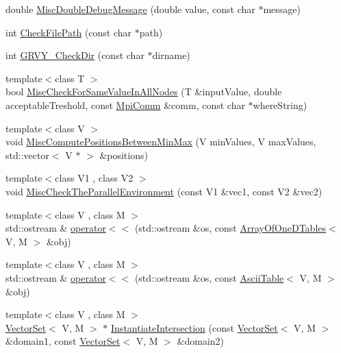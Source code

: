 \begin{DoxyCompactItemize}
\item 
double \hyperlink{namespace_q_u_e_s_o_a976de592e2133af50b80f6aad1352165}{Misc\-Double\-Debug\-Message} (double value, const char $\ast$message)
\item 
int \hyperlink{namespace_q_u_e_s_o_abc55c11f68bb99c4eba88030f1164764}{Check\-File\-Path} (const char $\ast$path)
\item 
int \hyperlink{namespace_q_u_e_s_o_a56d7533d2177cf02d3fd761f7a22a873}{G\-R\-V\-Y\-\_\-\-Check\-Dir} (const char $\ast$dirname)
\item 
{\footnotesize template$<$class T $>$ }\\bool \hyperlink{namespace_q_u_e_s_o_a4166a375c5adbea35afaaf20775bc519}{Misc\-Check\-For\-Same\-Value\-In\-All\-Nodes} (T \&input\-Value, double acceptable\-Treshold, const \hyperlink{class_q_u_e_s_o_1_1_mpi_comm}{Mpi\-Comm} \&comm, const char $\ast$where\-String)
\item 
{\footnotesize template$<$class V $>$ }\\void \hyperlink{namespace_q_u_e_s_o_a3a6b46538ead03c47f13e60542608e34}{Misc\-Compute\-Positions\-Between\-Min\-Max} (V min\-Values, V max\-Values, std\-::vector$<$ V $\ast$ $>$ \&positions)
\item 
{\footnotesize template$<$class V1 , class V2 $>$ }\\void \hyperlink{namespace_q_u_e_s_o_a57ad15be98b39ff64e0719305c639c75}{Misc\-Check\-The\-Parallel\-Environment} (const V1 \&vec1, const V2 \&vec2)
\item 
{\footnotesize template$<$class V , class M $>$ }\\std\-::ostream \& \hyperlink{namespace_q_u_e_s_o_a741c4181f77af64b1e82cdce4d203cfa}{operator$<$$<$} (std\-::ostream \&os, const \hyperlink{class_q_u_e_s_o_1_1_array_of_one_d_tables}{Array\-Of\-One\-D\-Tables}$<$ V, M $>$ \&obj)
\item 
{\footnotesize template$<$class V , class M $>$ }\\std\-::ostream \& \hyperlink{namespace_q_u_e_s_o_abd30e6a15a8d9117611fddd7d06c3eed}{operator$<$$<$} (std\-::ostream \&os, const \hyperlink{class_q_u_e_s_o_1_1_ascii_table}{Ascii\-Table}$<$ V, M $>$ \&obj)
\item 
{\footnotesize template$<$class V , class M $>$ }\\\hyperlink{class_q_u_e_s_o_1_1_vector_set}{Vector\-Set}$<$ V, M $>$ $\ast$ \hyperlink{namespace_q_u_e_s_o_aa79046437ab085c5487ae16e9a0baeec}{Instantiate\-Intersection} (const \hyperlink{class_q_u_e_s_o_1_1_vector_set}{Vector\-Set}$<$ V, M $>$ \&domain1, const \hyperlink{class_q_u_e_s_o_1_1_vector_set}{Vector\-Set}$<$ V, M $>$ \&domain2)

\end{DoxyCompactItemize}
